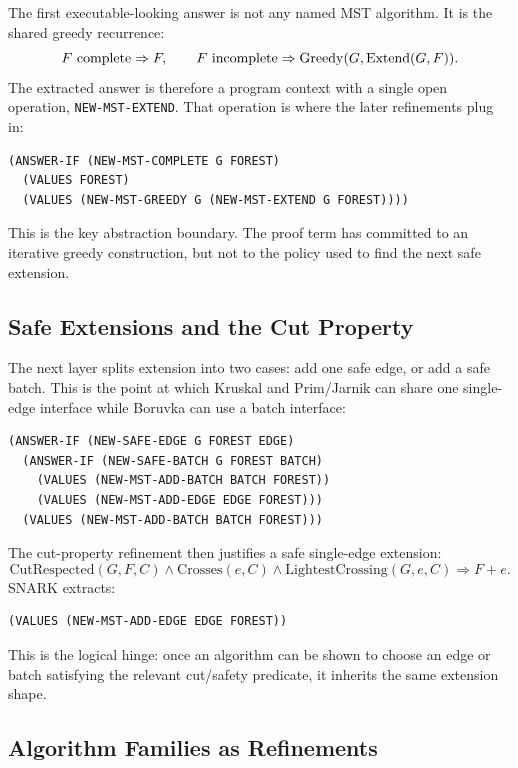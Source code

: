 \documentclass[runningheads]{llncs}
\begin{document}
The first executable-looking answer is not any named MST algorithm.  It is the
shared greedy recurrence:
\[
  F\ \hbox{complete} \Rightarrow F,\qquad
  F\ \hbox{incomplete} \Rightarrow
  \mathrm{Greedy}(G,\mathrm{Extend}(G,F)).
\]
The extracted answer is therefore a program context with a single open
operation, \texttt{NEW-MST-EXTEND}.  That operation is where the later
refinements plug in:
\begin{lstlisting}
(ANSWER-IF (NEW-MST-COMPLETE G FOREST)
  (VALUES FOREST)
  (VALUES (NEW-MST-GREEDY G (NEW-MST-EXTEND G FOREST))))
\end{lstlisting}
This is the key abstraction boundary.  The proof term has committed to an
iterative greedy construction, but not to the policy used to find the next safe
extension.

\subsection{Safe Extensions and the Cut Property}

The next layer splits extension into two cases: add one safe edge, or add a
safe batch.  This is the point at which Kruskal and Prim/Jarnik can share one
single-edge interface while Boruvka can use a batch interface:
\begin{lstlisting}
(ANSWER-IF (NEW-SAFE-EDGE G FOREST EDGE)
  (ANSWER-IF (NEW-SAFE-BATCH G FOREST BATCH)
    (VALUES (NEW-MST-ADD-BATCH BATCH FOREST))
    (VALUES (NEW-MST-ADD-EDGE EDGE FOREST)))
  (VALUES (NEW-MST-ADD-BATCH BATCH FOREST)))
\end{lstlisting}
The cut-property refinement then justifies a safe single-edge extension:
\[
  \mathrm{CutRespected}(G,F,C)\land
  \mathrm{Crosses}(e,C)\land
  \mathrm{LightestCrossing}(G,e,C)
  \Rightarrow F+e.
\]
SNARK extracts:
\begin{lstlisting}
(VALUES (NEW-MST-ADD-EDGE EDGE FOREST))
\end{lstlisting}
This is the logical hinge: once an algorithm can be shown to choose an edge or
batch satisfying the relevant cut/safety predicate, it inherits the same
extension shape.

\subsection{Algorithm Families as Refinements}
\end{document}
